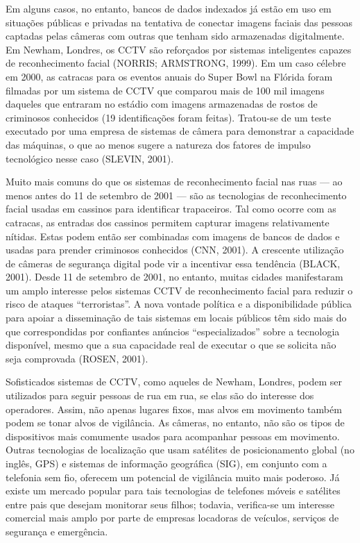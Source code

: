 Em alguns casos, no entanto, bancos de dados indexados já estão em uso
em situações públicas e privadas na tentativa de conectar imagens
faciais das pessoas captadas pelas câmeras com outras que tenham sido
armazenadas digitalmente. Em Newham, Londres, os CCTV são reforçados por
sistemas inteligentes capazes de reconhecimento facial (NORRIS;
ARMSTRONG, 1999). Em um caso célebre em 2000, as catracas para os
eventos anuais do Super Bowl na Flórida foram filmadas por um sistema de
CCTV que comparou mais de 100 mil imagens daqueles que entraram no
estádio com imagens armazenadas de rostos de criminosos conhecidos (19
identificações foram feitas). Tratou-se de um teste executado por uma
empresa de sistemas de câmera para demonstrar a capacidade das máquinas,
o que ao menos sugere a natureza dos fatores de impulso tecnológico
nesse caso (SLEVIN, 2001).

Muito mais comuns do que os sistemas de reconhecimento facial nas ruas
--- ao menos antes do 11 de setembro de 2001 --- são as tecnologias de
reconhecimento facial usadas em cassinos para identificar trapaceiros.
Tal como ocorre com as catracas, as entradas dos cassinos permitem
capturar imagens relativamente nítidas. Estas podem então ser combinadas
com imagens de bancos de dados e usadas para prender criminosos
conhecidos (CNN, 2001). A crescente utilização de câmeras de segurança
digital pode vir a incentivar essa tendência (BLACK, 2001). Desde 11 de
setembro de 2001, no entanto, muitas cidades manifestaram um amplo
interesse pelos sistemas CCTV de reconhecimento facial para reduzir o
risco de ataques ``terroristas''. A nova vontade política e a
disponibilidade pública para apoiar a disseminação de tais sistemas em
locais públicos têm sido mais do que correspondidas por confiantes
anúncios ``especializados'' sobre a tecnologia disponível, mesmo que a
sua capacidade real de executar o que se solicita não seja comprovada
(ROSEN, 2001).

Sofisticados sistemas de CCTV, como aqueles de Newham, Londres, podem
ser utilizados para seguir pessoas de rua em rua, se elas são do
interesse dos operadores. Assim, não apenas lugares fixos, mas alvos em
movimento também podem se tonar alvos de vigilância. As câmeras, no
entanto, não são os tipos de dispositivos mais comumente usados para
acompanhar pessoas em movimento. Outras tecnologias de localização que
usam satélites de posicionamento global (no inglês, GPS) e sistemas de
informação geográfica (SIG), em conjunto com a telefonia sem fio,
oferecem um potencial de vigilância muito mais poderoso. Já existe um
mercado popular para tais tecnologias de telefones móveis e satélites
entre pais que desejam monitorar seus filhos; todavia, verifica-se um
interesse comercial mais amplo por parte de empresas locadoras de
veículos, serviços de segurança e emergência.

